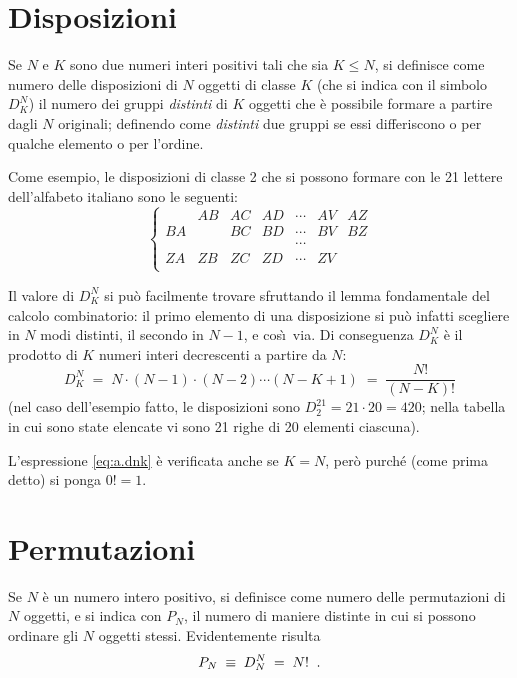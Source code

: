 \section{Disposizioni}%
Se $N$ e $K$ sono due numeri interi positivi tali che sia $K
\le N$, si definisce come numero delle disposizioni di $N$
oggetti di classe $K$ (che si indica con il simbolo $D^N_K$)
il numero dei gruppi \emph{distinti} di $K$ oggetti che \`e
possibile formare a partire dagli $N$ originali; definendo
come \emph{distinti} due gruppi se essi differiscono o per
qualche elemento o per l'ordine.

Come esempio, le disposizioni di classe 2 che si possono
formare con le 21 lettere dell'alfabeto italiano sono le
seguenti:
\begin{equation*}
  \left\{ \begin{array}{lllllll}
       & AB & AC & AD & \cdots & AV & AZ \\
    BA &    & BC & BD & \cdots & BV & BZ \\
       &    &    &    & \cdots &    &    \\
    ZA & ZB & ZC & ZD & \cdots & ZV &    \\
  \end{array} \right.
\end{equation*}

Il valore di $D^N_K$ si pu\`o facilmente trovare sfruttando
il lemma fondamentale del calcolo combinatorio: il primo
elemento di una disposizione si pu\`o infatti scegliere in
$N$ modi distinti, il secondo in $N-1$, e cos\`\i\ via.  Di
conseguenza $D^N_K$ \`e il prodotto di $K$ numeri interi
decrescenti a partire da $N$:
\begin{equation} \label{eq:a.dnk}
  D^N_K \; = \; N \cdot (N-1) \cdot (N-2) \cdots
    (N-K+1) \; = \; \frac{N!}{(N-K)!}
\end{equation}
(nel caso dell'esempio fatto, le disposizioni sono $D^{21}_2
= 21 \cdot 20 = 420$; nella tabella in cui sono state
elencate vi sono 21 righe di 20 elementi ciascuna).

L'espressione \eqref{eq:a.dnk} \`e verificata anche se
$K=N$, per\`o purch\'e (come prima detto) si ponga $0!=1$.%

\section{Permutazioni}%
Se $N$ \`e un numero intero positivo, si definisce come
numero delle permutazioni di $N$ oggetti, e si indica con
$P_N$, il numero di maniere distinte in cui si possono
ordinare gli $N$ oggetti stessi.  Evidentemente risulta
\begin{equation*}
  P_N \; \equiv \; D^N_N \; = \; N! \;\; .
\end{equation*}%


